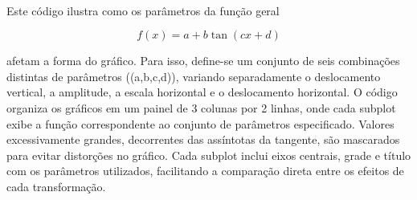 \documentclass[11pt]{article}
\begin{document}
    \begin{center}
    \end{center}
    { \hspace*{\fill} \\}
    
    Este código ilustra como os parâmetros da função geral

\[f(x) = a + b\tan(cx+d)\]

afetam a forma do gráfico. Para isso, define-se um conjunto de seis
combinações distintas de parâmetros ((a,b,c,d)), variando separadamente
o deslocamento vertical, a amplitude, a escala horizontal e o
deslocamento horizontal. O código organiza os gráficos em um painel de 3
colunas por 2 linhas, onde cada subplot exibe a função correspondente ao
conjunto de parâmetros especificado. Valores excessivamente grandes,
decorrentes das assíntotas da tangente, são mascarados para evitar
distorções no gráfico. Cada subplot inclui eixos centrais, grade e
título com os parâmetros utilizados, facilitando a comparação direta
entre os efeitos de cada transformação.
\end{document}
